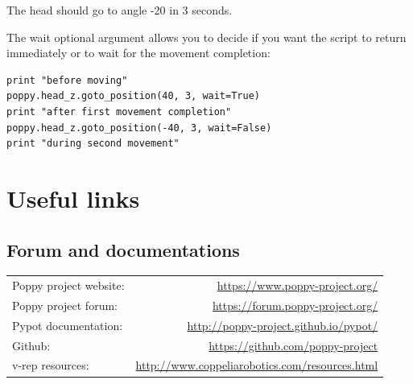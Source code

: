 \documentclass{article}
\begin{document}
The head should go to angle -20 in 3 seconds.

The wait optional argument allows you to decide if you want the script to return immediately or to wait for the movement completion:

\begin{verbatim}
print "before moving"
poppy.head_z.goto_position(40, 3, wait=True)
print "after first movement completion"
poppy.head_z.goto_position(-40, 3, wait=False)
print "during second movement"
\end{verbatim}




%
%
%
%
%




\section{Useful links}
\label{documentation-links}

\subsection{Forum and documentations}

\begin{tabular}{lr}

Poppy project website: & \url{https://www.poppy-project.org/} \\ 

Poppy project forum: & \url{https://forum.poppy-project.org/} \\ 
 
Pypot documentation: & \url{http://poppy-project.github.io/pypot/} \\ 

Github: & \url{https://github.com/poppy-project} \\ 

v-rep resources: & \url{http://www.coppeliarobotics.com/resources.html} \\ 
\end{tabular} 
\end{document}
